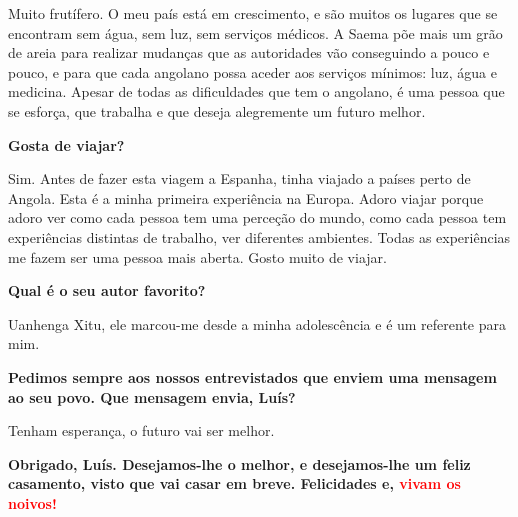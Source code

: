 \vspace{10pt}

Muito frutífero. O meu país está em crescimento, e são muitos os
lugares que se encontram sem água, sem luz, sem serviços médicos. A
Saema põe mais um grão de areia para realizar mudanças que as
autoridades vão conseguindo a pouco e pouco, e para que cada angolano
possa aceder aos serviços mínimos: luz, água e medicina. Apesar de
todas as dificuldades que tem o angolano, é uma pessoa que se esforça,
que trabalha e que deseja alegremente um futuro melhor.

\vspace{10pt}

{\bf Gosta de viajar?}

\vspace{10pt}

Sim. Antes de fazer esta viagem a Espanha, tinha viajado a países
perto de Angola. Esta é a minha primeira experiência na Europa. Adoro
viajar porque adoro ver como cada pessoa tem uma perceção do mundo,
como cada pessoa tem experiências distintas de trabalho, ver
diferentes ambientes. Todas as experiências me fazem ser uma pessoa
mais aberta. Gosto muito de viajar.

\vspace{10pt}

{\bf Qual é o seu autor favorito?}

\vspace{10pt}

Uanhenga Xitu, ele marcou-me desde a minha adolescência e é um referente para mim.

\vspace{10pt}

{\bf Pedimos sempre aos nossos entrevistados que enviem uma mensagem
  ao seu povo. Que mensagem envia, Luís?}

\vspace{10pt}

Tenham esperança, o futuro vai ser melhor. 


\vspace{10pt}

{\bf Obrigado, Luís. Desejamos-lhe o melhor, e desejamos-lhe um feliz casamento, visto que vai casar em breve. Felicidades e, \textcolor{red}{vivam os noivos!}}

